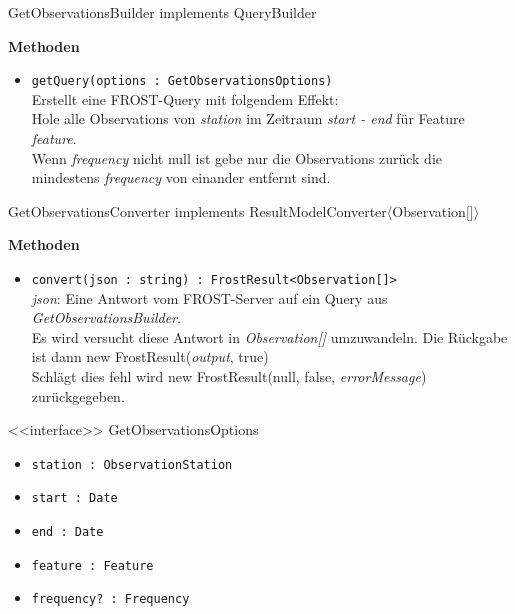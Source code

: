 \begin{Class}{GetObservationsBuilder implements QueryBuilder}

    \textbf{Methoden}
    \begin{itemize}
        \item \texttt{getQuery(options : GetObservationsOptions)}
        \\ Erstellt eine FROST-Query mit folgendem Effekt:
        \\ Hole alle Observations von \emph{station} im Zeitraum \emph{start - end}
        für Feature \emph{feature}.
        \\ Wenn \emph{frequency} nicht null ist gebe nur die Observations zurück 
        die mindestens \emph{frequency} von einander entfernt sind.
    \end{itemize}
\end{Class}

\begin{Class}{GetObservationsConverter implements ResultModelConverter$\langle$Observation$\lbrack\rbrack\rangle$}

    \textbf{Methoden}
    \begin{itemize}
        \item \texttt{convert(json : string) : FrostResult<Observation[]>}
        \\ \emph{json}: Eine Antwort vom FROST-Server auf ein Query aus \emph{GetObservationsBuilder}.
        \\ Es wird versucht diese Antwort in \emph{Observation[]} umzuwandeln.
        Die Rückgabe ist dann new FrostResult(\emph{output}, true)
        \\ Schlägt dies fehl wird new FrostResult(null, false, \emph{errorMessage}) zurückgegeben.
    \end{itemize}
\end{Class}

\begin{Class}{<<interface>> GetObservationsOptions}
\begin{itemize}
    \item \texttt{station : ObservationStation}
    \item \texttt{start : Date}
    \item \texttt{end : Date}
    \item \texttt{feature : Feature}
    \item \texttt{frequency? : Frequency}
\end{itemize}
\end{Class}


